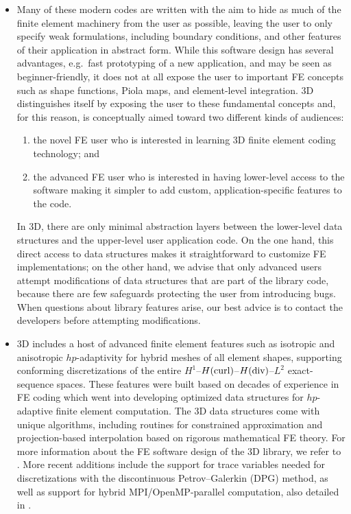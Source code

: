 \begin{itemize}
\item Many of these modern codes are written with the aim to hide as much of the finite element machinery from the user as possible, leaving the user to only specify weak formulations, including boundary conditions, and other features of their application in abstract form. While this software design has several advantages, e.g.~fast prototyping of a new application, and may be seen as beginner-friendly, it does not at all expose the user to important FE concepts such as shape functions, Piola maps, and element-level integration. \hp3D distinguishes itself by exposing the user to these fundamental concepts and, for this reason, is conceptually aimed toward two different kinds of audiences:
\begin{enumerate}
	\item the novel FE user who is interested in learning 3D finite element coding technology; and 
	\item the advanced FE user who is interested in having lower-level access to the software making it simpler to add custom, application-specific features to the code. 
\end{enumerate}
In \hp3D, there are only minimal abstraction layers between the lower-level data structures and the upper-level user application code. On the one hand, this direct access to data structures makes it straightforward to customize FE implementations; on the other hand, we advise that only advanced users attempt modifications of data structures that are part of the library code, because there are few safeguards protecting the user from introducing bugs. When questions about library features arise, our best advice is to contact the developers before attempting modifications.

\item \hp3D includes a host of advanced finite element features such as isotropic and anisotropic $hp$-adaptivity for hybrid meshes of all element shapes, supporting conforming discretizations of the entire $H^1$--$H(\text{curl})$--$H(\text{div})$--$L^2$ exact-sequence spaces. These features were built based on decades of experience in FE coding which went into developing optimized data structures for $hp$-adaptive finite element computation. The \hp3D data structures come with unique algorithms, including routines for constrained approximation and projection-based interpolation based on rigorous mathematical FE theory. For more information about the FE software design of the \hp3D library, we refer to \cite{hpbook2,hpbook3}. More recent additions include the support for trace variables needed for discretizations with the discontinuous Petrov--Galerkin (DPG) method, as well as support for hybrid MPI/OpenMP-parallel computation, also detailed in \cite{hpbook3}.


\end{itemize}
